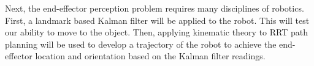 Next, the end-effector perception problem requires many disciplines of robotics.  First, a landmark based Kalman filter will be applied to the robot.  This will test our ability to move to the object.  Then, applying kinematic theory to RRT path planning will be used to develop a trajectory of the robot to achieve the end-effector location and orientation based on the Kalman filter readings.